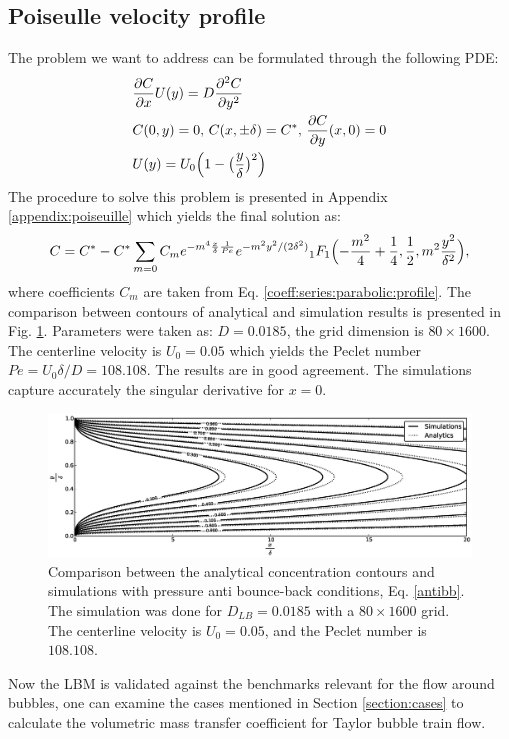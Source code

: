 \documentclass[review,12pt]{elsarticle}
\newcommand{\beq}{\begin{equation}}
\newcommand{\feq}{\end{equation}}
\newcommand{\cstar}{C^{*}}
\begin{document}
\subsection{Poiseulle velocity profile}
The problem we want to address can be formulated through the following PDE:
\beq
\begin{aligned}
&\frac{\partial C}{\partial x} U(y)=D\frac{\partial^2 C}{\partial y^2}\\
&C(0,y)=0,\, C(x,\pm \delta)=\cstar,\, \frac{\partial C}{\partial y }(x,0)=0\\
&U(y)=U_0 \Bigl(1-\bigl(\frac{y}{\delta}\bigr)^2\Bigr)
\end{aligned}
\feq
The procedure to solve this problem is presented in Appendix \ref{appendix:poiseuille} which yields
the final solution as:
\begin{equation}
C=\cstar-\cstar \sum_{m=0}{C_m e^{-m^4 \frac{x}{\delta}\frac{1}{Pe}} e^{-m^2
y^2/(2\delta^2)}{_1F_1}\Bigl(-\frac{m^2}{4}+\frac{1}{4},\frac{1}{2},m^2 \frac{y^2}{\delta^2}\Bigr)},
\end{equation}
where coefficients $C_m$ are taken from Eq. \ref{coeff:series:parabolic:profile}. The comparison
between contours of analytical and simulation results is presented in Fig.
\ref{fig:parabolic:comparison}. Parameters were taken as: $D=0.0185$, the grid dimension is $80\times1600$. The centerline velocity is  $U_0=0.05$
which yields the Peclet number $Pe=U_0 \delta / D= 108.108$.
The results are in good agreement. The simulations capture accurately the singular derivative for $x=0$.
\begin{figure}[htb!]
\includegraphics[width=\textwidth]{parabolic_profile_comparison.eps}
\caption{Comparison between the analytical concentration contours and simulations with pressure
anti bounce-back conditions, Eq. \ref{antibb}. The simulation was done for $D_{LB}=0.0185$ with a
$80\times1600$ grid. The centerline velocity is $U_0=0.05$, and the Peclet number is $108.108$. \label{fig:parabolic:comparison}}
\end{figure}

Now the LBM is validated against the benchmarks relevant for the flow around bubbles, one can
examine the cases mentioned in Section
\ref{section:cases} to calculate the volumetric mass transfer coefficient for Taylor bubble train flow.
\end{document}

